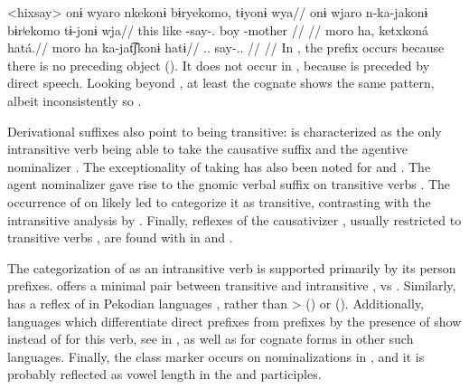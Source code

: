 \pex<hixsay>\hixka
{}
\begingl
\glpreamble onɨ wyaro nkekonɨ bɨryekomo, tɨyonɨ wya//
\gla onɨ wjaro n-ka-jakonɨ bɨrʲekomo tɨ-jonɨ wja//
\glb this like -say-. boy -mother //
\glft {} \parencite[][36]{hixkaryanaderby1985}//
\endgl
{}
\begingl
\glpreamble moro ha, ketxkoná hatá.//
\gla moro ha ka-jat͡ʃkonɨ hatɨ//
\glb {}..  say-.. //
\glft {} \parencite[][14]{derbyshire1965textos}//
\endgl
\xe
In , the prefix  occurs because there is no preceding object ().
It does not occur in , because  is preceded by direct speech.
Looking beyond \hixka, at least the \trio cognate shows the same pattern, albeit inconsistently so \parencite[267]{triocarlin2004}.

Derivational suffixes also point to   being transitive:
\trio {} is characterized as the only intransitive verb being able to take the causative suffix  and the agentive nominalizer  \parencite[263, 169]{triomeira1999}.
The exceptionality of   taking   has also been noted for \kalina \parencite[82]{courtz2008carib} and \wayana \parencite[258]{wayanatavares2005}.
The agent nominalizer  gave rise to the \panare gnomic verbal suffix  on transitive verbs \parencite[184--185]{gildea1998}.
The occurrence of  on  likely led \textcite[214]{panarepayne2013} to categorize it as transitive, contrasting with the intransitive analysis by \textcite[102]{mattei1994diccionario}.
Finally, reflexes of the causativizer , usually restricted to transitive verbs \parencite{gildea2015valency}, are found with  in \apalai \parencite[51]{koehn1986apalai} and \waiwai \parencite[52]{waiwaihawkins1998}.

The categorization of  as an intransitive verb is supported primarily by its person prefixes.
\kalina offers a minimal pair between transitive   and intransitive  ,   vs   \parencite[288, 45]{courtz2008carib}.
Similarly,  has a reflex of   in Pekodian languages , rather than >  (\bakairi) or  (\PXin).
Additionally, languages which differentiate direct prefixes from  prefixes by the presence of  \parencite[495]{meira2010origin} show  instead of  for this verb, see \akuriyo in , as well as \textcites[294]{triomeira1999}[195]{wayanatavares2005}[288]{ikpengpacheco2001}[150]{alves2017arara}[168]{hoff1968carib} for cognate forms in other such languages.
Finally, the  class marker  occurs on nominalizations in \kalina {}, and it is probably reflected as vowel length in the \trio \parencite[333]{triomeira1999} and \wayana \parencite[196]{wayanatavares2005} participles.

